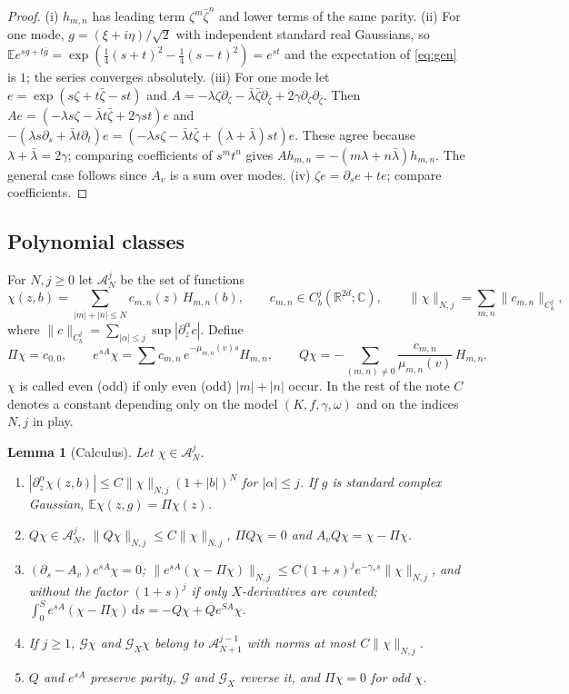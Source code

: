 \documentclass[11pt]{article}
\newcommand{\dd}{\mathrm{d}}
\newcommand{\E}{\mathbb{E}}
\newcommand{\cG}{\mathcal{G}}
\newcommand{\cA}{\mathcal{A}}
\newcommand{\R}{\mathbb{R}}
\newcommand{\C}{\mathbb{C}}
\newcommand{\nrm}[2]{\|#1\|_{#2}}
\newtheorem{lemma}[theorem]{Lemma}
\theoremstyle{remark}
\begin{document}
\begin{proof}
(i) $h_{m,n}$ has leading term $\zeta^m\bar\zeta^n$ and lower terms of the
same parity. (ii) For one mode, $g=(\xi+i\eta)/\sqrt2$ with independent
standard real Gaussians, so
$\E e^{sg+t\bar g}=\exp(\tfrac14(s+t)^2-\tfrac14(s-t)^2)=e^{st}$ and the
expectation of \eqref{eq:gen} is $1$; the series converges absolutely.
(iii) For one mode let $e=\exp(s\zeta+t\bar\zeta-st)$ and
$A=-\lambda\zeta\partial_\zeta-\bar\lambda\bar\zeta\partial_{\bar\zeta}
+2\gamma\partial_\zeta\partial_{\bar\zeta}$. Then
$Ae=(-\lambda s\zeta-\bar\lambda t\bar\zeta+2\gamma st)e$ and
$-(\lambda s\partial_s+\bar\lambda t\partial_t)e
=(-\lambda s\zeta-\bar\lambda t\bar\zeta+(\lambda+\bar\lambda)st)e$. These
agree because $\lambda+\bar\lambda=2\gamma$; comparing coefficients of
$s^mt^n$ gives $Ah_{m,n}=-(m\lambda+n\bar\lambda)h_{m,n}$. The general case
follows since $A_v$ is a sum over modes. (iv) $\zeta e=\partial_se+te$;
compare coefficients.
\end{proof}

\subsection{Polynomial classes}

For $N,j\ge0$ let $\cA_N^j$ be the set of functions
\[
  \chi(z,b)=\sum_{|m|+|n|\le N}c_{m,n}(z)\,H_{m,n}(b),\qquad
  c_{m,n}\in C_b^j(\R^{2d};\C),\qquad
  \nrm{\chi}{N,j}=\sum_{m,n}\nrm{c_{m,n}}{C_b^j},
\]
where $\nrm{c}{C_b^j}=\sum_{|\alpha|\le j}\sup|\partial_z^\alpha c|$. Define
\[
  \Pi\chi=c_{0,0},\qquad
  e^{sA}\chi=\sum c_{m,n}\,e^{-\mu_{m,n}(v)s}H_{m,n},\qquad
  Q\chi=-\sum_{(m,n)\ne0}\frac{c_{m,n}}{\mu_{m,n}(v)}\,H_{m,n}.
\]
$\chi$ is called even (odd) if only even (odd) $|m|+|n|$ occur. In the
rest of the note $C$ denotes a constant depending only on the model
$(K,f,\gamma,\omega)$ and on the indices $N,j$ in play.

\begin{lemma}[Calculus]\label{lem:calc}
Let $\chi\in\cA_N^j$.
\begin{enumerate}
  \item[(a)] $|\partial_z^\alpha\chi(z,b)|\le C\nrm{\chi}{N,j}(1+|b|)^N$
    for $|\alpha|\le j$. If $g$ is standard complex Gaussian,
    $\E\chi(z,g)=\Pi\chi(z)$.
  \item[(b)] $Q\chi\in\cA_N^j$, $\nrm{Q\chi}{N,j}\le C\nrm{\chi}{N,j}$,
    $\Pi Q\chi=0$ and $A_vQ\chi=\chi-\Pi\chi$.
  \item[(c)] $(\partial_s-A_v)e^{sA}\chi=0$;
    $\nrm{e^{sA}(\chi-\Pi\chi)}{N,j}\le C(1+s)^je^{-\gamma_*s}\nrm{\chi}{N,j}$,
    and without the factor $(1+s)^j$ if only $X$-derivatives are counted;
    $\int_0^Se^{sA}(\chi-\Pi\chi)\,\dd s=-Q\chi+Qe^{SA}\chi$.
  \item[(d)] If $j\ge1$, $\cG\chi$ and $\cG_X\chi$ belong to
    $\cA_{N+1}^{j-1}$ with norms at most $C\nrm{\chi}{N,j}$.
  \item[(e)] $Q$ and $e^{sA}$ preserve parity, $\cG$ and $\cG_X$ reverse
    it, and $\Pi\chi=0$ for odd $\chi$.
\end{enumerate}
\end{lemma}
\end{document}
